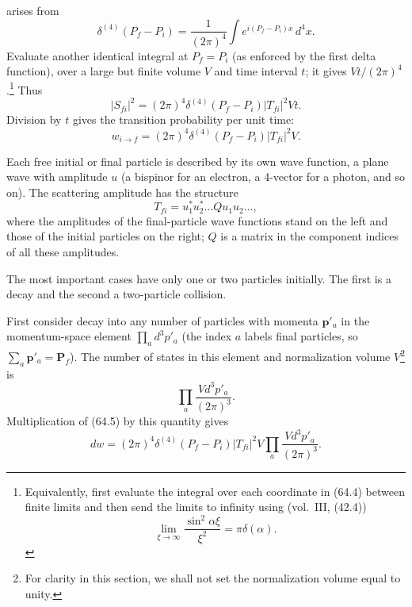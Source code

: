 arises from
\begin{equation}
\delta^{(4)}(P_f-P_i)=\frac1{(2\pi)^4}\int e^{i(P_f-P_i)x}\,d^4x.
\tag{64.4}
\end{equation}
Evaluate another identical integral at $P_f=P_i$ (as enforced by the first delta function), over a large but finite volume $V$ and time interval $t$; it gives $Vt/(2\pi)^4$.\footnote{Equivalently, first evaluate the integral over each coordinate in (64.4) between finite limits and then send the limits to infinity using (vol.~III, (42.4))
\[
\lim_{\xi\to\infty}\frac{\sin^2\alpha\xi}{\xi^2}=\pi\delta(\alpha).
\]} Thus
\[
|S_{fi}|^2=(2\pi)^4\delta^{(4)}(P_f-P_i)|T_{fi}|^2Vt.
\]
Division by $t$ gives the transition probability per unit time:
\begin{equation}
w_{i\to f}=(2\pi)^4\delta^{(4)}(P_f-P_i)|T_{fi}|^2V.
\tag{64.5}
\end{equation}

Each free initial or final particle is described by its own wave function, a plane wave with amplitude $u$ (a bispinor for an electron, a 4-vector for a photon, and so on). The scattering amplitude has the structure
\begin{equation}
T_{fi}=u_1^*u_2^*\ldots Q u_1u_2\ldots,
\tag{64.6}
\end{equation}
where the amplitudes of the final-particle wave functions stand on the left and those of the initial particles on the right; $Q$ is a matrix in the component indices of all these amplitudes.

The most important cases have only one or two particles initially. The first is a decay and the second a two-particle collision.

First consider decay into any number of particles with momenta $\mathbf p'_a$ in the momentum-space element $\prod_a d^3p'_a$ (the index $a$ labels final particles, so $\sum_a\mathbf p'_a=\mathbf P_f$). The number of states in this element and normalization volume $V$\footnote{For clarity in this section, we shall not set the normalization volume equal to unity.} is
\[
\prod_a\frac{Vd^3p'_a}{(2\pi)^3}.
\]
Multiplication of (64.5) by this quantity gives
\begin{equation}
dw=(2\pi)^4\delta^{(4)}(P_f-P_i)|T_{fi}|^2V\prod_a\frac{Vd^3p'_a}{(2\pi)^3}.
\tag{64.7}
\end{equation}

